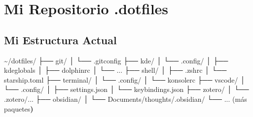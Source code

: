 \documentclass[
  doc,
  floatsintext,
  longtable,
  a4paper,
  nolmodern,
  notxfonts,
  notimes,
  12pt,
  colorlinks=true,linkcolor=blue,citecolor=blue,urlcolor=blue]{apa7}
\newenvironment{Shaded}{\begin{snugshade}}{\end{snugshade}}
\newcommand{\AttributeTok}[1]{\textcolor[rgb]{0.40,0.45,0.13}{#1}}
\newcommand{\BuiltInTok}[1]{\textcolor[rgb]{0.00,0.23,0.31}{#1}}
\newcommand{\CommentTok}[1]{\textcolor[rgb]{0.37,0.37,0.37}{#1}}
\newcommand{\ErrorTok}[1]{\textcolor[rgb]{0.68,0.00,0.00}{#1}}
\newcommand{\ExtensionTok}[1]{\textcolor[rgb]{0.00,0.23,0.31}{#1}}
\newcommand{\FunctionTok}[1]{\textcolor[rgb]{0.28,0.35,0.67}{#1}}
\newcommand{\KeywordTok}[1]{\textcolor[rgb]{0.00,0.23,0.31}{\textbf{#1}}}
\newcommand{\NormalTok}[1]{\textcolor[rgb]{0.00,0.23,0.31}{#1}}
\newcommand{\OperatorTok}[1]{\textcolor[rgb]{0.37,0.37,0.37}{#1}}
\newcommand{\StringTok}[1]{\textcolor[rgb]{0.13,0.47,0.30}{#1}}
\begin{document}
\begin{Shaded}
\end{Shaded}

\section{Mi Repositorio .dotfiles}\label{mi-repositorio-.dotfiles}

\subsection{Mi Estructura Actual}\label{mi-estructura-actual}

\begin{Shaded}
\begin{Highlighting}[]
\ExtensionTok{\textasciitilde{}/dotfiles/}
\ExtensionTok{├──}\NormalTok{ git/}
\ExtensionTok{│}\NormalTok{   └── .gitconfig}
\ExtensionTok{├──}\NormalTok{ kde/}
\ExtensionTok{│}\NormalTok{   └── .config/}
\ExtensionTok{│}\NormalTok{       ├── kdeglobals}
\ExtensionTok{│}\NormalTok{       ├── dolphinrc}
\ExtensionTok{│}\NormalTok{       └── ...}
\ExtensionTok{├──}\NormalTok{ shell/}
\ExtensionTok{│}\NormalTok{   ├── .zshrc}
\ExtensionTok{│}\NormalTok{   └── starship.toml}
\ExtensionTok{├──}\NormalTok{ terminal/}
\ExtensionTok{│}\NormalTok{   └── .config/}
\ExtensionTok{│}\NormalTok{       └── konsolerc}
\ExtensionTok{├──}\NormalTok{ vscode/}
\ExtensionTok{│}\NormalTok{   └── .config/}
\ExtensionTok{│}\NormalTok{       ├── settings.json}
\ExtensionTok{│}\NormalTok{       └── keybindings.json}
\ExtensionTok{├──}\NormalTok{ zotero/}
\ExtensionTok{│}\NormalTok{   └── .zotero/...}
\ExtensionTok{├──}\NormalTok{ obsidian/}
\ExtensionTok{│}\NormalTok{   └── Documents/thoughts/.obsidian/}
\ExtensionTok{└──}\NormalTok{ ... }\ErrorTok{(}\ExtensionTok{más}\NormalTok{ paquetes}\KeywordTok{)}
\end{Highlighting}
\end{Shaded}
\end{document}
